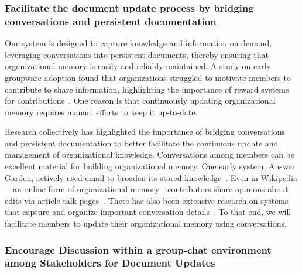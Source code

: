 \documentclass[sigconf,screen]{acmart}
\begin{document}
\subsubsection{Facilitate the document update process by bridging conversations and persistent documentation}

Our system is designed to capture knowledge and information on demand, leveraging conversations into persistent documents, thereby ensuring that organizational memory is easily and reliably maintained. A study on early groupware adoption found that organizations struggled to motivate members to contribute to share information, highlighting the importance of reward systems for contributions~\cite{orlikowski1992learning}. One reason is that continuously updating organizational memory requires manual efforts to keep it up-to-date. 

Research collectively has highlighted the importance of bridging conversations and persistent documentation to better facilitate the continuous update and management of organizational knowledge. Conversations among members can be excellent material for building organizational memory. One early system, Answer Garden, actively used email to broaden its stored knowledge~\cite{ackerman1990answer}. Even in Wikipedia—an online form of organizational memory—contributors share opinions about edits via article talk pages~\cite{kittur2008harnessing, schneider2011understanding}. There has also been extensive research on systems that capture and organize important conversation details~\cite{nam2007arkose, zhang2017wikum, zhang2018making}. To that end, we will facilitate members to update their organizational memory using conversations.


\subsubsection{Encourage Discussion within a group-chat environment among Stakeholders for Document Updates}
\end{document}
